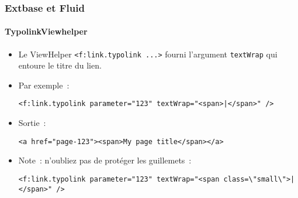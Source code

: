 %

\begin{frame}[fragile]
	\frametitle{Extbase et Fluid}
	\framesubtitle{TypolinkViewhelper}


	\begin{itemize}
		\item Le ViewHelper \texttt{<f:link.typolink ...>} fourni l'argument
			\texttt{textWrap} qui entoure le titre du lien.

		\item Par exemple~:
\begin{lstlisting}
<f:link.typolink parameter="123" textWrap="<span>|</span>" />
\end{lstlisting}

		\item Sortie~:
\begin{lstlisting}
<a href="page-123"><span>My page title</span></a>
\end{lstlisting}

		\item Note~: n'oubliez pas de protéger les guillemets~:
\begin{lstlisting}
<f:link.typolink parameter="123" textWrap="<span class=\"small\">|</span>" />
\end{lstlisting}

	\end{itemize}

\end{frame}


